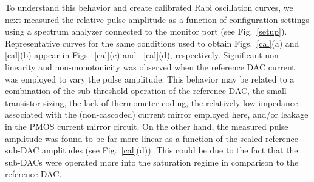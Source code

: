 \documentclass[journal]{IEEEtran}
\newcommand{\CR}[1]{{\color{black}#1}}
\begin{document}
\CR{To understand this behavior and create calibrated Rabi oscillation curves, we next measured the relative pulse amplitude as a function of configuration settings using a spectrum analyzer connected to the monitor port (see Fig.~\ref{setup}). Representative curves for the same conditions used to obtain Figs.~\ref{cal}(a) and \ref{cal}(b) appear in Figs.~\ref{cal}(c) and ~\ref{cal}(d), respectively. Significant non-linearity and non-monotonicity was observed when the reference DAC current was employed to vary the pulse amplitude. This behavior may be related to a combination of the sub-threshold operation of the reference DAC, the small transistor sizing, the lack of thermometer coding,  the relatively low impedance associated with the (non-cascoded) current mirror employed here, and/or leakage in the PMOS current mirror circuit. On the other hand, the measured pulse amplitude was found to be far more linear as a function of the scaled reference sub-DAC amplitudes (see Fig.~\ref{cal}(d)). This could be due to the fact that the sub-DACs were operated more into the saturation regime in comparison to the reference DAC.}


\end{document}

